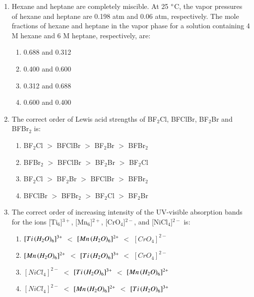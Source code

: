 \documentclass[journal,12pt,onecolumn]{IEEEtran}
\begin{document}
\begin{enumerate}
    \item Hexane and heptane are completely miscible. At 25 $\degree$C, the vapor pressures of hexane and heptane are 0.198 atm and 0.06 atm, respectively. The mole fractions of hexane and heptane in the vapor phase for a solution containing 4 M hexane and 6 M heptane, respectively, are:
    \begin{multicols}{2}
    \begin{enumerate}
        \item 0.688 and 0.312
        \item 0.400 and 0.600
        \item 0.312 and 0.688
        \item 0.600 and 0.400
    \end{enumerate}
    \end{multicols}
    \hfill{}
  \item The correct order of Lewis acid strengths of BF$_2$Cl, BFClBr, BF$_2$Br and BFBr$_2$ is:
    \begin{multicols}{2}
    \begin{enumerate}
        \item BF$_2$Cl $>$ BFClBr $>$ BF$_2$Br $>$ BFBr$_2$
        \item BFBr$_2$ $>$ BFClBr $>$ BF$_2$Br $>$ BF$_2$Cl
        \item BF$_2$Cl $>$ BF$_2$Br $>$ BFClBr $>$ BFBr$_2$
        \item BFClBr $>$ BFBr$_2$ $>$ BF$_2$Cl $>$ BF$_2$Br
    \end{enumerate}
    \end{multicols}
    \hfill{}

    \item The correct order of increasing intensity  of the UV-visible absorption bands for the ions [Ti$_6$]$^{3+}$, [Mn$_6$]$^{2+}$, [CrO$_4$]$^{2-}$, and [NiCl$_4$]$^{2-}$ is:
    
 \begin{enumerate}
    \item $[Ti\left(H_2O\right)_6]^{3+}$ $<$ $[Mn\left(H_2O\right)_6]^{2+}$ $<$ $[CrO_4]^{2-}$
    \item $[Mn\left(H_2O\right)_6]^{2+}$ $<$ $[Ti\left(H_2O\right)_6]^{3+}$ $<$ $[CrO_4]^{2-}$
    \item $[NiCl_4]^{2-}$ $<$ $[Ti\left(H_2O\right)_6]^{3+}$ $<$ $[Mn\left(H_2O\right)_6]^{2+}$
    \item $[NiCl_4]^{2-}$ $<$ $[Mn\left(H_2O\right)_6]^{2+}$ $<$ $[Ti\left(H_2O\right)_6]^{3+}$
\end{enumerate}
    

\end{enumerate}
\end{document}
